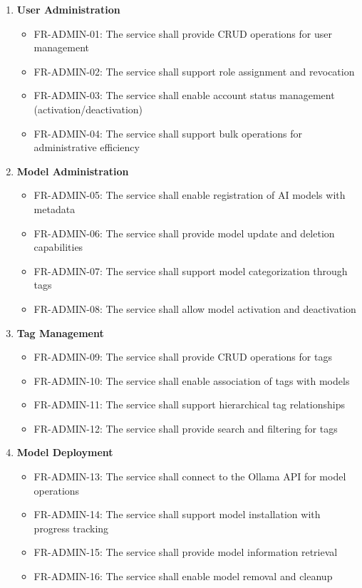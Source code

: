 \begin{enumerate}
   \item \textbf{User Administration}
   \begin{itemize}
      \item FR-ADMIN-01: The service shall provide CRUD operations for user management
      \item FR-ADMIN-02: The service shall support role assignment and revocation
      \item FR-ADMIN-03: The service shall enable account status management (activation/deactivation)
      \item FR-ADMIN-04: The service shall support bulk operations for administrative efficiency
   \end{itemize}

   \item \textbf{Model Administration}
   \begin{itemize}
      \item FR-ADMIN-05: The service shall enable registration of AI models with metadata
      \item FR-ADMIN-06: The service shall provide model update and deletion capabilities
      \item FR-ADMIN-07: The service shall support model categorization through tags
      \item FR-ADMIN-08: The service shall allow model activation and deactivation
   \end{itemize}

   \item \textbf{Tag Management}
   \begin{itemize}
      \item FR-ADMIN-09: The service shall provide CRUD operations for tags
      \item FR-ADMIN-10: The service shall enable association of tags with models
      \item FR-ADMIN-11: The service shall support hierarchical tag relationships
      \item FR-ADMIN-12: The service shall provide search and filtering for tags
   \end{itemize}

   \item \textbf{Model Deployment}
   \begin{itemize}
      \item FR-ADMIN-13: The service shall connect to the Ollama API for model operations
      \item FR-ADMIN-14: The service shall support model installation with progress tracking
      \item FR-ADMIN-15: The service shall provide model information retrieval
      \item FR-ADMIN-16: The service shall enable model removal and cleanup
   \end{itemize}
\end{enumerate}

